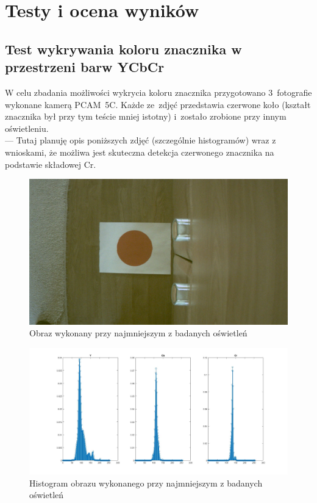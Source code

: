 \chapter{Testy i ocena wyników}
\label{cha:Testy i ocena wyników}
\section{Test wykrywania koloru znacznika w przestrzeni barw YCbCr} 
\label{sec:Test wykrywania koloru znacznika w przestrzeni barw YCbCr}
W celu zbadania możliwości wykrycia koloru znacznika przygotowano 3~fotografie wykonane kamerą PCAM~5C. Każde ze~zdjęć przedstawia czerwone koło (kształt znacznika był przy tym teście mniej istotny) i~zostało zrobione przy innym oświetleniu.\\
--- Tutaj planuję opis poniższych zdjęć (szczególnie histogramów) wraz z wnioskami, że możliwa jest skuteczna detekcja czerwonego znacznika na podstawie składowej Cr.
\begin{figure}[h]
	\centering
	\includegraphics[width=\textwidth]{osw1.jpg}
	\caption{Obraz wykonany przy najmniejszym z badanych oświetleń}
	\label{fig:osw1}
\end{figure}
\begin{figure}[h]
	\centering
	\includegraphics[width=\textwidth]{hist1.jpg}
	\caption{Histogram obrazu wykonanego przy najmniejszym z badanych oświetleń}
	\label{fig:hist1}
\end{figure}
